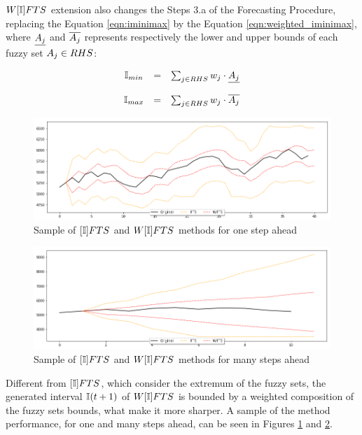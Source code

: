 $W[\mathbb{I}]FTS$ extension also changes the Steps 3.a of the Forecasting Procedure, replacing the Equation \ref{eqn:iminimax} by the Equation \ref{eqn:weighted_iminimax}, where $\underline{A_j}$ and $\overline{A_j}$ represents respectively the lower and upper bounds of each fuzzy set $A_j \in RHS$:

\begin{equation}
\begin{array}{ccc}
\mathbb{I}_{min} & = & \sum_{j \in RHS} w_j \cdot \underline{A_j} \\
& & \\
\mathbb{I}_{max} & = & \sum_{j \in RHS} w_j \cdot \overline{A_j}
\end{array}
\label{eqn:weighted_iminimax}
\end{equation}

\begin{figure}[htb]
    \centering
    \includegraphics[width=\textwidth]{figures/ifts_sample_onestep.png}
    \caption{Sample of $[\mathbb{I}]FTS$ and $W[\mathbb{I}]FTS$ methods for one step ahead}
    \label{fig:ifts_sample_onestep}
\end{figure}

\begin{figure}[htb]
    \centering
    \includegraphics[width=\textwidth]{figures/ifts_sample_manystep.png}
    \caption{Sample of $[\mathbb{I}]FTS$ and $W[\mathbb{I}]FTS$ methods for many steps ahead}
    \label{fig:ifts_sample_manystep}
\end{figure}

Different from $[\mathbb{I}]FTS$, which consider the extremum of the fuzzy sets, the generated interval $\mathbb{I}(t+1)$ of $W[\mathbb{I}]FTS$ is bounded by a weighted composition of the fuzzy sets bounds, what make it more sharper. A sample of the method performance, for one and many steps ahead, can be seen in Figures \ref{fig:ifts_sample_onestep} and \ref{fig:ifts_sample_manystep}. 

